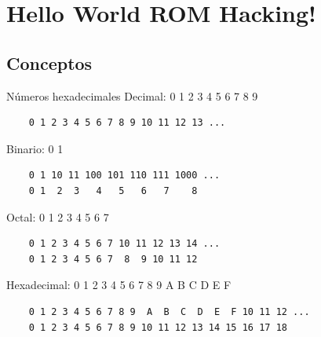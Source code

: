 \section{Hello World ROM Hacking!}
\subsection{Conceptos}
\begin{frame}[fragile]{Números hexadecimales}
    Decimal: 0 1 2 3 4 5 6 7 8 9
    \begin{verbatim}
    0 1 2 3 4 5 6 7 8 9 10 11 12 13 ...\end{verbatim}

    Binario: 0 1
    \begin{verbatim}
    0 1 10 11 100 101 110 111 1000 ...
    0 1  2  3   4   5   6   7    8\end{verbatim}

    Octal: 0 1 2 3 4 5 6 7
    \begin{verbatim}
    0 1 2 3 4 5 6 7 10 11 12 13 14 ...
    0 1 2 3 4 5 6 7  8  9 10 11 12\end{verbatim}

    Hexadecimal: 0 1 2 3 4 5 6 7 8 9 A B C D E F
    \begin{verbatim}
    0 1 2 3 4 5 6 7 8 9  A  B  C  D  E  F 10 11 12 ...
    0 1 2 3 4 5 6 7 8 9 10 11 12 13 14 15 16 17 18\end{verbatim}
\end{frame}

